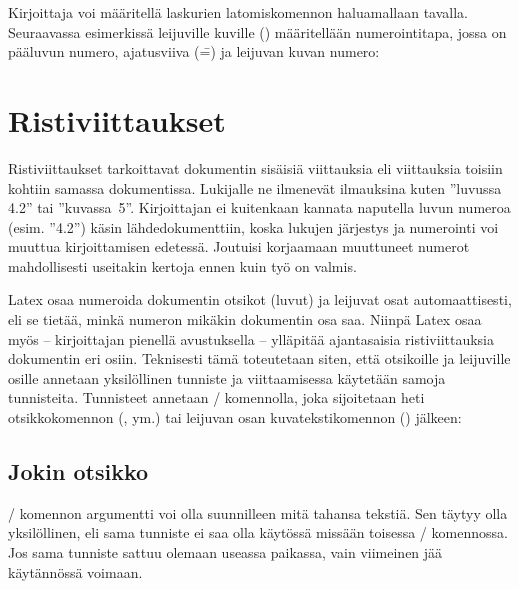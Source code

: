 Kirjoittaja voi määritellä laskurien latomiskomennon haluamallaan
tavalla. Seuraavassa esimerkissä leijuville kuville ()
määritellään numerointitapa, jossa on pääluvun numero, ajatusviiva (\==)
ja leijuvan kuvan numero:

\begin{koodilohkosis}
\renewcommand{\thefigure}{\thechapter--\arabic{figure}}
\end{koodilohkosis}

\section{Ristiviittaukset}
\label{luku/ristiviitteet}

Ristiviittaukset tarkoittavat dokumentin sisäisiä viittauksia eli
viittauksia toisiin kohtiin samassa dokumentissa. Lukijalle ne ilmenevät
ilmauksina kuten ''luvussa 4.2'' tai ''kuvassa~5''. Kirjoittajan ei
kuitenkaan kannata naputella luvun numeroa (esim. ''4.2'') käsin
lähdedokumenttiin, koska lukujen järjestys ja numerointi voi muuttua
kirjoittamisen edetessä. Joutuisi korjaamaan muuttuneet numerot
mahdollisesti useitakin kertoja ennen kuin työ on valmis.

Latex osaa numeroida dokumentin otsikot (luvut) ja leijuvat osat
automaattisesti, eli se tietää, minkä numeron mikäkin dokumentin osa
saa. Niinpä Latex osaa myös -- kirjoittajan pienellä avustuksella --
ylläpitää ajantasaisia ristiviittauksia dokumentin eri osiin. Teknisesti
tämä toteutetaan siten, että otsikoille ja leijuville osille annetaan
yksilöllinen tunniste ja viittaamisessa käytetään samoja tunnisteita.
Tunnisteet annetaan \-/ komennolla, joka sijoitetaan heti
otsikkokomennon (,  ym.) tai
leijuvan osan kuvatekstikomennon () jälkeen:

\begin{koodilohkosis}
\section{Jokin otsikko}
\label{tunniste}
\end{koodilohkosis}

\-/ komennon argumentti  voi olla
suunnilleen mitä tahansa tekstiä. Sen täytyy olla yksilöllinen, eli sama
tunniste ei saa olla käytössä missään toisessa \-/
komennossa. Jos sama tunniste sattuu olemaan useassa paikassa, vain
viimeinen jää käytännössä voimaan.

